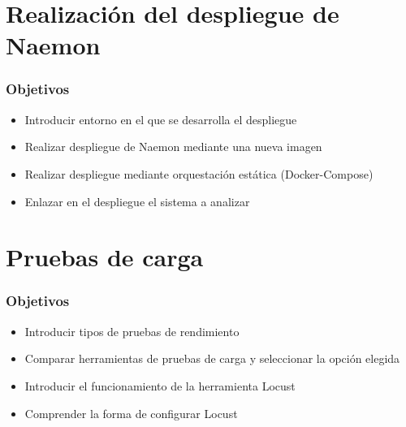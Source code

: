 \documentclass{beamer}
\theoremstyle{plain}
\theoremstyle{definition}
\theoremstyle{plain}
\theoremstyle{definition}
\theoremstyle{remark}
\theoremstyle{definition}
\begin{document}
\section{Realización del despliegue de Naemon} %
\begin{frame}
	
	\frametitle{Objetivos}
	\begin{itemize}
		\item Introducir entorno en el que se desarrolla el despliegue
		\item Realizar despliegue de Naemon mediante una nueva imagen
		\item Realizar despliegue mediante orquestación estática (Docker-Compose)
		\item Enlazar en el despliegue el sistema a analizar
	\end{itemize}
	
\end{frame}

\section{Pruebas de carga} %
\begin{frame}
	
	\frametitle{Objetivos}
	\begin{itemize}
		\item Introducir tipos de pruebas de rendimiento
		\item Comparar herramientas de pruebas de carga y seleccionar la opción elegida
		\item Introducir el funcionamiento de la herramienta Locust
		\item Comprender la forma de configurar Locust 
	\end{itemize}
	
\end{frame}
\end{document}
